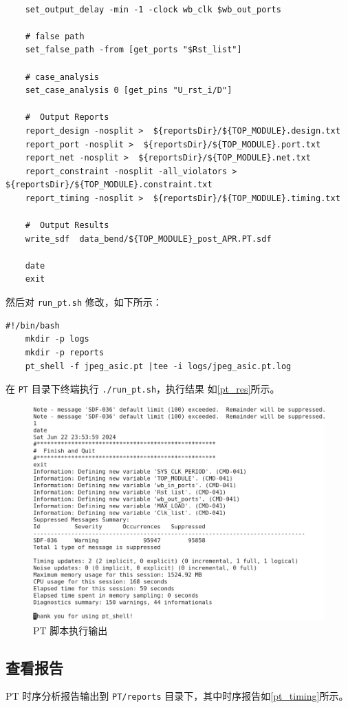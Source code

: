 \documentclass[12pt,hyperref,a4paper,UTF8]{ctexart}
\begin{document}
\newpage
\begin{lstlisting}[style=tclstyle,name=jpeg_asic.pt]

    set_output_delay -min -1 -clock wb_clk $wb_out_ports

    # false path
    set_false_path -from [get_ports "$Rst_list"]

    # case_analysis
    set_case_analysis 0 [get_pins "U_rst_i/D"]

    #  Output Reports
    report_design -nosplit >  ${reportsDir}/${TOP_MODULE}.design.txt
    report_port -nosplit >  ${reportsDir}/${TOP_MODULE}.port.txt
    report_net -nosplit >  ${reportsDir}/${TOP_MODULE}.net.txt
    report_constraint -nosplit -all_violators >  ${reportsDir}/${TOP_MODULE}.constraint.txt
    report_timing -nosplit >  ${reportsDir}/${TOP_MODULE}.timing.txt

    #  Output Results
    write_sdf  data_bend/${TOP_MODULE}_post_APR.PT.sdf

    date
    exit
\end{lstlisting}

然后对 \texttt{run\_pt.sh} 修改，如下所示：
\begin{lstlisting}[style=bashstyle,name=run_fm.scr]
    #!/bin/bash
    mkdir -p logs
    mkdir -p reports
    pt_shell -f jpeg_asic.pt |tee -i logs/jpeg_asic.pt.log
\end{lstlisting}

在 \texttt{PT} 目录下终端执行 \texttt{./run\_pt.sh}，执行结果
如\autoref{pt_res}所示。

\begin{figure}[htbp]
    \centering
    \includegraphics[width =.7\textwidth]{figures/pt_results.png}
    \caption{PT 脚本执行输出}
    \label{pt_res}
\end{figure}

\subsection{查看报告}
PT 时序分析报告输出到 \texttt{PT/reports} 目录下，其中时序报告如\autoref{pt_timing}所示。
\end{document}
